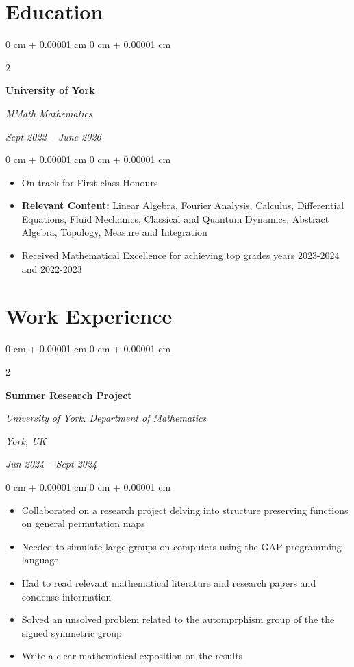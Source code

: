 \documentclass[10pt, letterpaper]{article}
\newenvironment{highlights}{
    \begin{itemize}[
        topsep=0.10 cm,
        parsep=0.10 cm,
        partopsep=0pt,
        itemsep=0pt,
        leftmargin=0 cm + 10pt
    ]
}{
    \end{itemize}
} %
\newenvironment{onecolentry}{
    \begin{adjustwidth}{
        0 cm + 0.00001 cm
    }{
        0 cm + 0.00001 cm
    }
}{
    \end{adjustwidth}
} %
\newenvironment{twocolentry}[2][]{
    \onecolentry
    \def\secondColumn{#2}
    \setcolumnwidth{\fill, 4.5 cm}
    \begin{paracol}{2}
}{
    \switchcolumn \raggedleft \secondColumn
    \end{paracol}
    \endonecolentry
} %
\begin{document}
    
    \section{Education}

    
        \begin{twocolentry}{
            
            
        \textit{Sept 2022 – June 2026}}
            \textbf{University of York}

            \textit{MMath Mathematics}
        \end{twocolentry}

        \vspace{0.10 cm}
        \begin{onecolentry}
            \begin{highlights}
                \item On track for First-class Honours
                \item \textbf{Relevant Content:} Linear Algebra, Fourier Analysis, Calculus, Differential Equations, Fluid Mechanics, Classical and Quantum Dynamics, Abstract Algebra, Topology, Measure and Integration
                \item Received Mathematical Excellence for achieving top grades years 2023-2024 and 2022-2023
            \end{highlights}
        \end{onecolentry}

    \section{Work Experience}

        
        \begin{twocolentry}{
        \textit{York, UK}    
            
        \textit{Jun 2024 – Sept 2024}}
            \textbf{Summer Research Project}
            
            \textit{University of York. Department of Mathematics}
        \end{twocolentry}

        \vspace{0.10 cm}
        \begin{onecolentry}
            \begin{itemize}
        
               \item Collaborated on a research project delving into structure preserving functions on general permutation maps
               \item Needed to simulate large groups on computers using the GAP programming language
               \item Had to read relevant mathematical literature and research papers and condense information
               \item Solved an unsolved problem related to the automprphism group of the the signed symmetric group
               \item Write a clear mathematical exposition on the results
            \end{itemize}
        \end{onecolentry}
\end{document}

